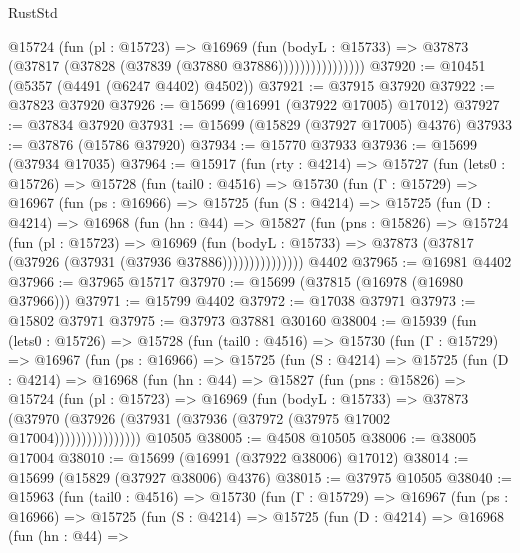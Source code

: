 \begin{lexlean}{RustStd}
\begin{coremodule}
                      @15724
                        (fun (pl : @15723) =>
                        @16969
                          (fun (bodyL : @15733) =>
                          @37873 (@37817 (@37828 (@37839 (@37880 @37886))))))))))))))))
@37920 := @10451 (@5357 (@4491 (@6247 @4402) @4502))
@37921 := @37915 @37920
@37922 := @37823 @37920
@37926 := @15699 (@16991 (@37922 @17005) @17012)
@37927 := @37834 @37920
@37931 := @15699 (@15829 (@37927 @17005) @4376)
@37933 := @37876 (@15786 @37920)
@37934 := @15770 @37933
@37936 := @15699 (@37934 @17035)
@37964 := @15917
    (fun (rty : @4214) =>
    @15727
      (fun (lets0 : @15726) =>
      @15728
        (fun (tail0 : @4516) =>
        @15730
          (fun (Γ : @15729) =>
          @16967
            (fun (ps : @16966) =>
            @15725
              (fun (S : @4214) =>
              @15725
                (fun (D : @4214) =>
                @16968
                  (fun (hn : @44) =>
                  @15827
                    (fun (pns : @15826) =>
                    @15724
                      (fun (pl : @15723) =>
                      @16969
                        (fun (bodyL : @15733) =>
                        @37873 (@37817 (@37926 (@37931 (@37936 @37886)))))))))))))))
    @4402
@37965 := @16981 @4402
@37966 := @37965 @15717
@37970 := @15699 (@37815 (@16978 (@16980 @37966)))
@37971 := @15799 @4402
@37972 := @17038 @37971
@37973 := @15802 @37971
@37975 := @37973 @37881 @30160
@38004 := @15939
    (fun (lets0 : @15726) =>
    @15728
      (fun (tail0 : @4516) =>
      @15730
        (fun (Γ : @15729) =>
        @16967
          (fun (ps : @16966) =>
          @15725
            (fun (S : @4214) =>
            @15725
              (fun (D : @4214) =>
              @16968
                (fun (hn : @44) =>
                @15827
                  (fun (pns : @15826) =>
                  @15724
                    (fun (pl : @15723) =>
                    @16969
                      (fun (bodyL : @15733) =>
                      @37873
                        (@37970
                          (@37926 (@37931 (@37936 (@37972 (@37975 @17002 @17004))))))))))))))))
    @10505
@38005 := @4508 @10505
@38006 := @38005 @17004
@38010 := @15699 (@16991 (@37922 @38006) @17012)
@38014 := @15699 (@15829 (@37927 @38006) @4376)
@38015 := @37975 @10505
@38040 := @15963
    (fun (tail0 : @4516) =>
    @15730
      (fun (Γ : @15729) =>
      @16967
        (fun (ps : @16966) =>
        @15725
          (fun (S : @4214) =>
          @15725
            (fun (D : @4214) =>
            @16968
              (fun (hn : @44) =>

\end{coremodule}
\end{lexlean}

